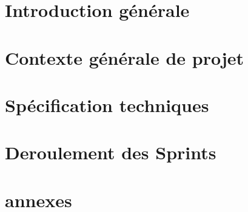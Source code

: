 \documentclass[12pt,twoside]{report}
\begin{document}
\tableofcontents %
\listoffigures %
\listoftables %


\chapter{Introduction générale} %


\chapter{Contexte générale  de projet} %


\chapter{Spécification techniques}


\chapter{Deroulement des Sprints}


\appendix

\printbibliography
\chapter{annexes} %

\end{document}
